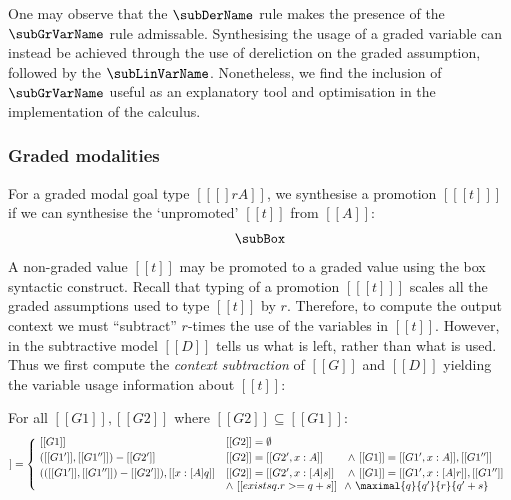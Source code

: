 One may observe that the $\subDerName$ rule makes the presence of the
$\subGrVarName$ rule admissable. Synthesising the usage of a graded variable can
instead be achieved through the use of dereliction on the graded assumption,
followed by the $\subLinVarName$. Nonetheless, we find the inclusion of
$\subGrVarName$ useful as an explanatory tool and optimisation in the
implementation of the calculus. 

  \subsubsection{Graded modalities}
  For a graded modal goal type $[[ [] r A ]]$, we synthesise a promotion
$[[ [ t ] ]]$ if we can synthesise the `unpromoted' $[[t]]$ from $[[A]]$:
  \begin{align*}
    \subBox
    \end{align*}
%
  A non-graded value $[[t]]$ may be promoted to a graded value using
  the box syntactic construct.
  Recall that typing of a promotion $[[ [ t ] ]]$
  scales all the graded assumptions used to type $[[ t ]]$ by $r$. Therefore,
  to compute the output context we must ``subtract'' $r$-times the use of the variables in $[[
  t ]]$. However, in the subtractive model $[[ D ]]$ tells us what is
  left, rather than what is used. Thus we first compute the
  \textit{context subtraction} of $[[G]]$ and $[[D]]$
  yielding the variable usage information about $[[ t ]]$:
  \begin{definition}\label{def:contextSub}
  For all $[[ G1 ]], [[ G2 ]]$ where $ [[G2]] \subseteq [[G1]]$:
\begin{align*}
[[G1 - G2]] =
\left\{\!\begin{matrix}
\begin{array}{lll}
[[G1]]
  & [[G2]] = \emptyset
\\[0.25em]
([[G1']], [[G1'']]) - [[G2']]
  & [[G2]] = [[ G2', x : A]] & \wedge\ [[G1]] = [[G1', x : A]], [[G1'']]
\\[0.25em]
(([[G1']], [[G1'']]) - [[G2']]), [[x : [A] q]]
  & [[ G2]] = [[G2', x : [A] s]] & \wedge\ [[G1]] = [[ G1',x : [A]
                                   r]],[[G1'']] \\[0em]
          & \wedge \ [[ exists q . r >= q + s]]
          & \!\! \wedge \ \maximal{q}{q'}{r}{q' + s}
\end{array}
\end{matrix}\right.
\end{align*}
%
\end{definition}
